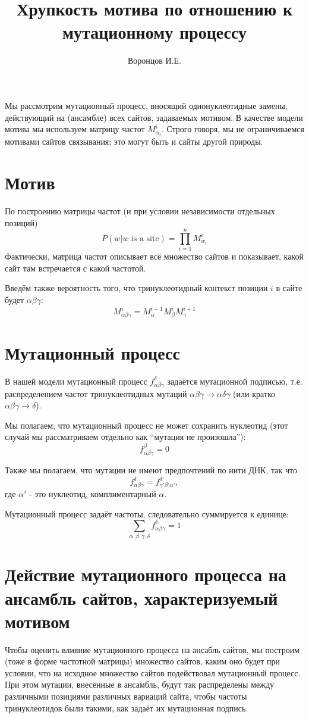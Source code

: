\documentclass[a4paper]{article}
\begin{document}
\title{Хрупкость мотива по отношению к мутационному процессу}
\author{Воронцов И.Е.}
\maketitle
Мы рассмотрим мутационный процесс, вносящий однонуклеотидные замены, действующий на (ансамбле) всех сайтов, задаваемых мотивом. В качестве модели мотива мы используем матрицу частот $M^i_{\alpha_i}$. Строго говоря, мы не ограничиваемся мотивами сайтов связывания; это могут быть и сайты другой природы.
\section{Мотив}
По построению матрицы частот (и при условии независимости отдельных позиций) $$P(w | w \text{ is a site}) = \prod_{i=1}^n M^i_{w_i}$$
Фактически, матрица частот описывает всё множество сайтов и показывает, какой сайт там встречается с какой частотой.

Введём также вероятность того, что тринуклеотидный контекст позиции $i$ в сайте будет $\alpha\beta\gamma$:
$$M^i_{\alpha\beta\gamma} = M^{i-1}_{\alpha}M^i_{\beta}M^{i+1}_{\gamma}$$

\section{Мутационный процесс}
В нашей модели мутационный процесс $f_{\alpha\beta\gamma}^{\delta}$ задаётся мутационной подписью, т.е. распределением частот тринуклеотидных мутаций $\alpha\beta\gamma\to\alpha\delta\gamma$ (или кратко $\alpha\beta\gamma\to\delta$).

Мы полагаем, что мутационный процесс не может сохранить нуклеотид (этот случай мы рассматриваем отдельно как ``мутация не произошла''):
$$f_{\alpha\beta\gamma}^{\beta} = 0$$

Также мы полагаем, что мутации не имеют предпочтений по нити ДНК, так что
$$f_{\alpha\beta\gamma}^{\delta} = f_{\gamma'\beta'\alpha'}^{\delta'},$$
где $\alpha'$ - это нуклеотид, комплиментарный $\alpha$.

Мутационный процесс задаёт частоты, следовательно суммируется к единице:
$$\sum_{\alpha,\beta,\gamma,\delta} f_{\alpha\beta\gamma}^{\delta} = 1$$

\section{Действие мутационного процесса на ансамбль сайтов, характеризуемый мотивом}
Чтобы оценить влияние мутационного процесса на ансабль сайтов, мы построим (тоже в форме частотной матрицы) множество сайтов, каким оно будет при условии, что на исходное множество сайтов подействовал мутационный процесс. При этом мутации, внесенные в ансамбль, будут так распределены между различными позициями различных вариаций сайта, чтобы частоты тринуклеотидов были такими, как задаёт их мутационная подпись. 
\end{document}
